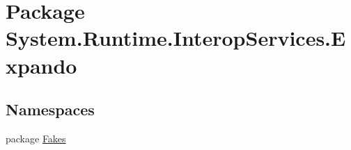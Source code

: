 \hypertarget{namespace_system_1_1_runtime_1_1_interop_services_1_1_expando}{\section{Package System.\-Runtime.\-Interop\-Services.\-Expando}
\label{namespace_system_1_1_runtime_1_1_interop_services_1_1_expando}
}
\subsection*{Namespaces}
\begin{DoxyCompactItemize}
\item 
package \hyperlink{namespace_system_1_1_runtime_1_1_interop_services_1_1_expando_1_1_fakes}{Fakes}
\end{DoxyCompactItemize}
